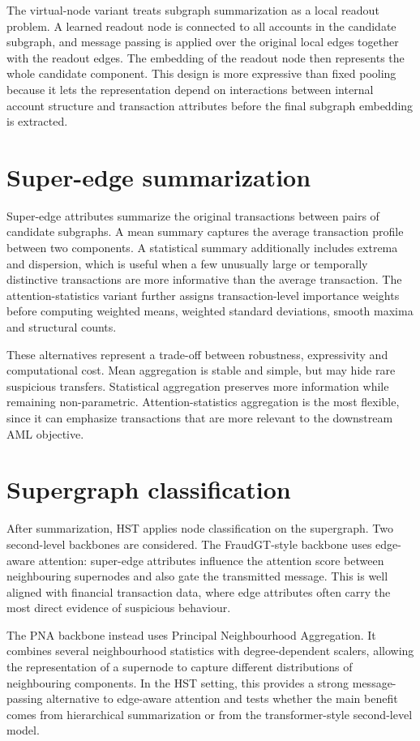 \documentclass[12pt, twocolumn]{report}
\begin{document}
The virtual-node variant treats subgraph summarization as a local readout problem. A learned readout node is connected to all accounts in the candidate subgraph, and message passing is applied over the original local edges together with the readout edges. The embedding of the readout node then represents the whole candidate component. This design is more expressive than fixed pooling because it lets the representation depend on interactions between internal account structure and transaction attributes before the final subgraph embedding is extracted.

\section{Super-edge summarization}

Super-edge attributes summarize the original transactions between pairs of candidate subgraphs. A mean summary captures the average transaction profile between two components. A statistical summary additionally includes extrema and dispersion, which is useful when a few unusually large or temporally distinctive transactions are more informative than the average transaction. The attention-statistics variant further assigns transaction-level importance weights before computing weighted means, weighted standard deviations, smooth maxima and structural counts.

These alternatives represent a trade-off between robustness, expressivity and computational cost. Mean aggregation is stable and simple, but may hide rare suspicious transfers. Statistical aggregation preserves more information while remaining non-parametric. Attention-statistics aggregation is the most flexible, since it can emphasize transactions that are more relevant to the downstream AML objective.

\section{Supergraph classification}

After summarization, HST applies node classification on the supergraph. Two second-level backbones are considered. The FraudGT-style backbone uses edge-aware attention: super-edge attributes influence the attention score between neighbouring supernodes and also gate the transmitted message. This is well aligned with financial transaction data, where edge attributes often carry the most direct evidence of suspicious behaviour.

The PNA backbone instead uses Principal Neighbourhood Aggregation. It combines several neighbourhood statistics with degree-dependent scalers, allowing the representation of a supernode to capture different distributions of neighbouring components. In the HST setting, this provides a strong message-passing alternative to edge-aware attention and tests whether the main benefit comes from hierarchical summarization or from the transformer-style second-level model.
\end{document}
